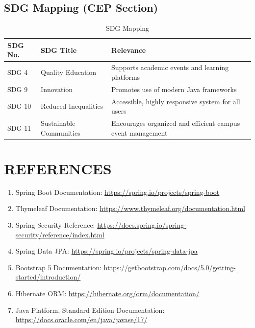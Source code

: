 \documentclass[12pt]{report}
\begin{document}
\vspace{0.5cm}

\section{SDG Mapping (CEP Section)}

\begin{table}[h!]
\centering
\footnotesize
\renewcommand{\arraystretch}{1.3}
\begin{tabular}{|p{2cm}|p{4cm}|p{7cm}|}
\hline
\textbf{SDG No.} & \textbf{SDG Title} & \textbf{Relevance} \\
\hline
SDG 4 & Quality Education & Supports academic events and learning platforms \\
\hline
SDG 9 & Innovation & Promotes use of modern Java frameworks \\
\hline
SDG 10 & Reduced Inequalities & Accessible, highly responsive system for all users \\
\hline
SDG 11 & Sustainable Communities & Encourages organized and efficient campus event management \\
\hline
\end{tabular}
\caption{SDG Mapping}
\end{table}
\newpage
\chapter*{REFERENCES}

\begin{enumerate}

\item Spring Boot Documentation: \url{https://spring.io/projects/spring-boot}

\item Thymeleaf Documentation: \url{https://www.thymeleaf.org/documentation.html}

\item Spring Security Reference: \url{https://docs.spring.io/spring-security/reference/index.html}

\item Spring Data JPA: \url{https://spring.io/projects/spring-data-jpa}

\item Bootstrap 5 Documentation: \url{https://getbootstrap.com/docs/5.0/getting-started/introduction/}

\item Hibernate ORM: \url{https://hibernate.org/orm/documentation/}

\item Java Platform, Standard Edition Documentation: \url{https://docs.oracle.com/en/java/javase/17/}

\end{enumerate}
\end{document}
